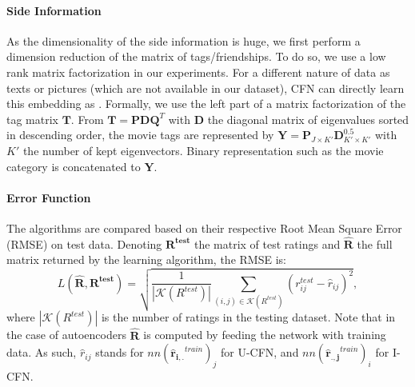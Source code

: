 \documentclass{article}
\newcommand{\mtx}[1]{\ensuremath{\mathbf{#1}}}
\begin{document}
\paragraph{Side Information}
As the dimensionality of the side information is huge, we first perform a dimension reduction of the matrix of tags/friendships. To do so, we use a low rank matrix factorization in our experiments. For a different nature of data as texts or pictures (which are not available in our dataset), CFN can directly learn this embedding as \cite{Wang2014b,Wang2014,Li2015}.
Formally, we use the left part of a matrix factorization of the tag matrix $\mtx{T}$. From  $\mtx{T} = \mtx{P} \mtx{D} \mtx{Q}^T$ with $\mtx{D}$ the diagonal matrix of eigenvalues sorted in descending order, the movie tags are represented by $\mtx{Y} = \mtx{P}_{J\times K'} \mtx{D}_{K'\times K'}^{0.5}$ with $K'$ the number of kept eigenvectors. Binary representation such as the movie category is concatenated to $\mtx{Y}$.

\paragraph{Error Function}
The algorithms are compared based on their respective Root Mean Square Error (RMSE) on test data.
Denoting $\mtx{R^{test}}$ the matrix of test ratings and $\mtx{\widehat{R}}$ the full matrix returned by the learning algorithm, the RMSE is:
\begin{equation}
L(\mtx{\widehat{R}}, \mtx{R^{test}}) = \sqrt{\frac{1}{|\mathcal{K}(R^{test})|}\sum_{(i,j)\in\mathcal{K}(R^{test})}(r_{ij}^{test}-\hat{r}_{ij})^2},
\end{equation}
where $|\mathcal{K}(R^{test})|$ is the number of ratings in the testing dataset.
Note that in the case of autoencoders $\mtx{\widehat{R}}$ is computed by feeding the network with training data. As such, $\hat{r}_{ij}$ stands for $nn(\mtx{\hat{r}_{i,.}}^{train})_j$ for U-CFN, and  $nn(\mtx{\hat{r}_{.,j}}^{train})_i$ for I-CFN.
\end{document}
